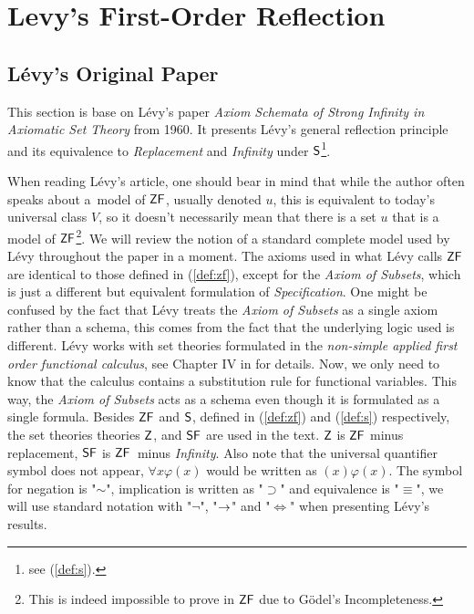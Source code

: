 \section{Levy's First-Order Reflection}\label{sec:first_order}

\subsection{Lévy's Original Paper}\label{sec:levy1960}
This section is base on Lévy's paper \emph{Axiom Schemata of Strong Infinity in Axiomatic Set Theory} \cite{Levy60a} from 1960. It presents Lévy's general reflection principle and its equivalence to \emph{Replacement} and \emph{Infinity} under $\sf{S}$\footnote{see (\ref{def:s}).}.

When reading Lévy's article, one should bear in mind that while the author often speaks about a~model of $\sf{ZF}$, usually denoted $u$, this is equivalent to today's universal class $V$, so it doesn't necessarily mean that there is a set $u$ that is a model of $\sf{ZF}$\footnote{This is indeed impossible to prove in $\sf{ZF}$ due to Gödel's Incompleteness.}. We will review the notion of a standard complete model used by Lévy throughout the paper in a moment.
The axioms used in what Lévy calls $\sf{ZF}$ are identical to those defined in (\ref{def:zf}), except for the \emph{Axiom of Subsets},
which is just a different but equivalent formulation of \emph{Specification}.
One might be confused by the fact that Lévy treats the \emph{Axiom of Subsets} as a single axiom rather than a schema, this comes from the fact that the underlying logic used is different. Lévy works with set theories formulated in the \emph{non-simple applied first order functional calculus}, see Chapter IV in \cite{church1996introduction} for details. Now, we only need to know that the calculus contains a substitution rule for functional variables. This way, the \emph{Axiom of Subsets} acts as a schema even though it is formulated as a single formula.
Besides $\sf{ZF}$ and $\sf{S}$, defined in (\ref{def:zf}) and (\ref{def:s}) respectively, the set theories theories $\sf{Z}$, and $\sf{SF}$ are used in the text. $\sf{Z}$ is $\sf{ZF}$ minus replacement, $\sf{SF}$ is $\sf{ZF}$ minus \emph{Infinity}. Also note that the universal quantifier symbol does not appear, $\forall x \varphi (x)$ would be written as $(x) \varphi (x)$. The symbol for negation is "$\sim$", implication is written as "$\supset$" and equivalence is "$\equiv$", we will use standard notation with "$\neg$", "$\rightarrow$" and "$\iff$" when presenting Lévy's results.

